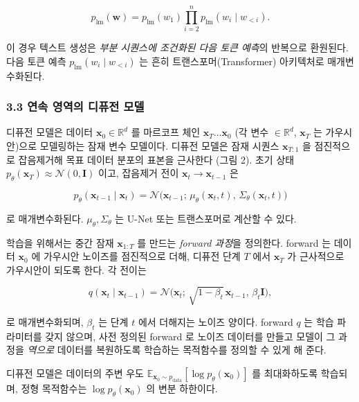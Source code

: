 \documentclass[
]{article}
\begin{document}
\[
p_\text{lm}(\mathbf{w}) = p_\text{lm}(w_1) \prod_{i=2}^{n} p_\text{lm}(w_i \mid w_{<i}).
\]

이 경우 텍스트 생성은 \emph{부분 시퀀스에 조건화된 다음 토큰 예측}의
반복으로 환원된다. 다음 토큰 예측 \(p_\text{lm}(w_i \mid w_{<i})\) 는
흔히 트랜스포머(Transformer) 아키텍처로 매개변수화된다.

\hypertarget{uxc5f0uxc18d-uxc601uxc5eduxc758-uxb514uxd4e8uxc804-uxbaa8uxb378}{%
\subsubsection{3.3 연속 영역의 디퓨전
모델}\label{uxc5f0uxc18d-uxc601uxc5eduxc758-uxb514uxd4e8uxc804-uxbaa8uxb378}}

디퓨전 모델은 데이터 \(\mathbf{x}_0 \in \mathbb{R}^d\) 를 마르코프 체인
\(\mathbf{x}_T \dots \mathbf{x}_0\) (각 변수 \(\in \mathbb{R}^d\),
\(\mathbf{x}_T\) 는 가우시안)으로 모델링하는 잠재 변수 모델이다. 디퓨전
모델은 잠재 시퀀스 \(\mathbf{x}_{T:1}\) 을 점진적으로 잡음제거해 목표
데이터 분포의 표본을 근사한다 (그림 2). 초기 상태
\(p_\theta(\mathbf{x}_T) \approx \mathcal{N}(0, \mathbf{I})\) 이고,
잡음제거 전이 \(\mathbf{x}_t \to \mathbf{x}_{t-1}\) 은

\[
p_\theta(\mathbf{x}_{t-1} \mid \mathbf{x}_t) = \mathcal{N}\big(\mathbf{x}_{t-1};\, \mu_\theta(\mathbf{x}_t, t),\, \Sigma_\theta(\mathbf{x}_t, t)\big)
\]

로 매개변수화된다. \(\mu_\theta, \Sigma_\theta\) 는 U-Net 또는
트랜스포머로 계산할 수 있다.

학습을 위해서는 중간 잠재 \(\mathbf{x}_{1:T}\) 를 만드는 \emph{forward
과정}을 정의한다. forward 는 데이터 \(\mathbf{x}_0\) 에 가우시안
노이즈를 점진적으로 더해, 디퓨전 단계 \(T\) 에서 \(\mathbf{x}_T\) 가
근사적으로 가우시안이 되도록 한다. 각 전이는

\[
q(\mathbf{x}_t \mid \mathbf{x}_{t-1}) = \mathcal{N}\big(\mathbf{x}_t;\, \sqrt{1-\beta_t}\,\mathbf{x}_{t-1},\, \beta_t \mathbf{I}\big),
\]

로 매개변수화되며, \(\beta_t\) 는 단계 \(t\) 에서 더해지는 노이즈
양이다. forward \(q\) 는 학습 파라미터를 갖지 않으며, 사전 정의된
forward 로 노이즈 데이터를 만들고 모델이 그 과정을 \emph{역으로}
데이터를 복원하도록 학습하는 목적함수를 정의할 수 있게 해 준다.

디퓨전 모델은 데이터의 주변 우도
\(\mathbb{E}_{\mathbf{x}_0 \sim p_\text{data}}[\log p_\theta(\mathbf{x}_0)]\)
를 최대화하도록 학습되며, 정형 목적함수는
\(\log p_\theta(\mathbf{x}_0)\) 의 변분 하한이다.
\end{document}
